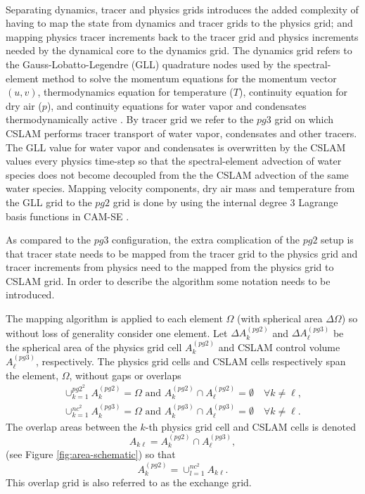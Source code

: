 {\color{red}{[DEFINE INCREMENT VERSUS TENDENCY CLEARLY; STRAIGHTEN OUT NOTATION FOR CSLAM GRID AND PG3 - ALSO IN FIGURES]}}\\

Separating dynamics, tracer and physics grids introduces the added complexity of having to map the state from dynamics and tracer grids to the physics grid; and mapping physics tracer increments back to the tracer grid and physics increments needed by the dynamical core to the dynamics grid. The dynamics grid refers to the Gauss-Lobatto-Legendre (GLL) quadrature nodes used by the spectral-element method to solve the momentum equations for the momentum vector $(u,v)$, thermodynamics equation for temperature ($T$), continuity equation for dry air ($p$), and continuity equations for water vapor and condensates thermodynamically active \citep[see, e.g., ][ for details]{LetAl2018JAMES}. By tracer grid we refer to the $pg3$ grid on which CSLAM performs tracer transport of water vapor, condensates and other tracers. The GLL value for water vapor and condensates is overwritten by the CSLAM values every physics time-step so that the spectral-element advection of water species does not become decoupled from the the CSLAM advection of the same water species. Mapping velocity components, dry air mass and temperature from the GLL grid to the $pg2$ grid is done by using the internal degree 3 Lagrange basis functions in CAM-SE \citep[as described in  ][ for pg3; exactly the same methods can be used for $pg2$]{HL2018MWR}.

As compared to the $pg3$ configuration, the extra complication of the $pg2$ setup is that tracer state needs to be mapped from the tracer grid to the physics grid and tracer increments from physics need to the mapped from the physics grid to CSLAM grid. In order to describe the algorithm some notation needs to be introduced.

The mapping algorithm is applied to each element $\Omega$ (with spherical area $\Delta \Omega$) so without loss of generality consider one element. Let $\Delta A^{(pg2)}_k$ and $\Delta A^{(pg3)}_\ell$ be the spherical area of the physics grid cell $A^{(pg2)}_k$ and CSLAM control volume $A^{(pg3)}_\ell$, respectively. The physics grid cells and CSLAM cells respectively span the element, $\Omega$, without gaps or overlaps
\begin{eqnarray}
\cup_{k=1}^{pg2^2}A^{(pg2)}_k=\Omega \text{ and } A^{(pg2)}_k \cap A^{(pg2)}_\ell = \emptyset \quad \forall k\ne \ell,\\
\cup_{k=1}^{nc^2}A^{(pg3)}_k=\Omega \text{ and } A^{(pg3)}_k \cap A^{(pg3)}_\ell = \emptyset \quad \forall k\ne \ell.
\end{eqnarray}
The overlap areas between the $k$-th physics grid cell and CSLAM cells is denoted
\begin{equation}
A_{k\ell}=A^{(pg2)}_k \cap A^{(pg3)}_\ell,
\end{equation}
(see Figure \ref{fig:area-schematic}) so that
\begin{equation}
A^{(pg2)}_k=\cup_{l=1}^{nc^2}A_{k\ell}.
\end{equation}
This overlap grid is also referred to as the exchange grid.
